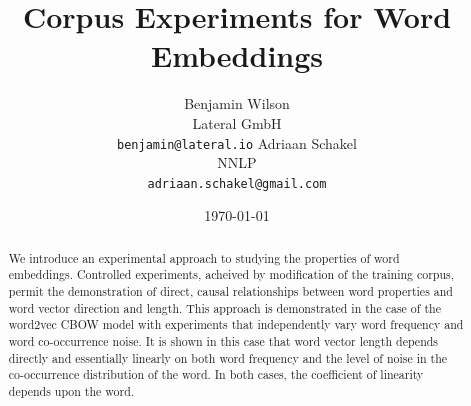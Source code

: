 \documentclass{article} %
\title{Corpus Experiments for Word Embeddings}
\author{
 	Benjamin Wilson\\
	Lateral GmbH\\
	\texttt{benjamin@lateral.io}
	\And
	Adriaan Schakel\\
	NNLP\\
	\texttt{adriaan.schakel@gmail.com}
 }
\date{\today}
\begin{document}
\graphicspath{{../outputs/}}
\maketitle


\begin{abstract}
	We introduce an experimental approach to studying the properties of word embeddings.
	Controlled experiments, acheived by modification of the training corpus, permit the demonstration of direct, causal relationships between word properties and word vector direction and length.
	This approach is demonstrated in the case of the word2vec CBOW model with experiments that independently vary word frequency and word co-occurrence noise.
	It is shown in this case that word vector length depends directly and essentially linearly on both word frequency and the level of noise in the co-occurrence distribution of the word.
	In both cases, the coefficient of linearity depends upon the word.
\end{abstract} 
\end{document}

